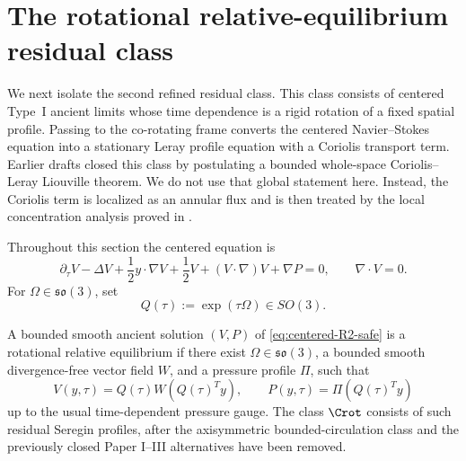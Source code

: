 
\section{The rotational relative-equilibrium residual class}
\label{sec:R2-reduction}

We next isolate the second refined residual class.  This class consists of
centered Type~I ancient limits whose time dependence is a rigid rotation of a
fixed spatial profile.  Passing to the co-rotating frame converts the centered
Navier--Stokes equation into a stationary Leray profile equation with a
Coriolis transport term.  Earlier drafts closed this class by postulating a
bounded whole-space Coriolis--Leray Liouville theorem.  We do not use that
global statement here.  Instead, the Coriolis term is localized as an annular
flux and is then treated by the local concentration analysis proved in
.

Throughout this section the centered equation is
\begin{equation}\label{eq:centered-R2-safe}
   \partial_\tau V-\Delta V+\frac12 y\cdot\nabla V+\frac12 V
   +(V\cdot\nabla)V+\nabla P=0,
   \qquad \nabla\cdot V=0 .
\end{equation}
For \(\Omega\in\mathfrak{so}(3)\), set
\begin{equation}\label{eq:rotation-group-R2-safe}
   Q(\tau):=\exp(\tau\Omega)\in SO(3).
\end{equation}

\begin{definition}
\label{def:R2-relative-profile-safe}
A bounded smooth ancient solution \((V,P)\) of \eqref{eq:centered-R2-safe} is a
rotational relative equilibrium if there exist
\(\Omega\in\mathfrak{so}(3)\), a bounded smooth divergence-free vector field
\(W\), and a pressure profile \(\Pi\), such that
\begin{equation}\label{eq:R2-relative-form-safe}
   V(y,\tau)=Q(\tau)W(Q(\tau)^Ty),
   \qquad
   P(y,\tau)=\Pi(Q(\tau)^Ty)
\end{equation}
up to the usual time-dependent pressure gauge.
The class \(\Crot\) consists of such residual Seregin profiles, after the
axisymmetric bounded-circulation class and the previously closed Paper I--III
alternatives have been removed.
\end{definition}

